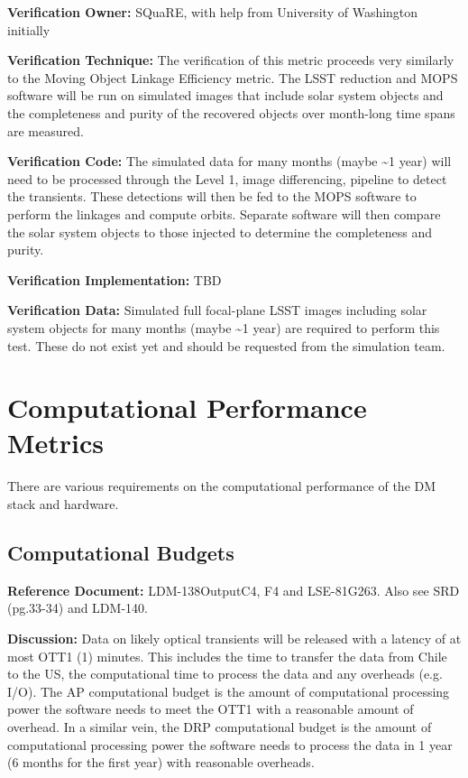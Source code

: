 \textbf{Verification Owner:} SQuaRE, with help from University of
Washington initially

\textbf{Verification Technique:} The verification of this metric
proceeds very similarly to the Moving Object Linkage Efficiency metric.
The LSST reduction and MOPS software will be run on simulated images
that include solar system objects and the completeness and purity of the
recovered objects over month-long time spans are measured.

\textbf{Verification Code:} The simulated data for many months (maybe
\textasciitilde{}1 year) will need to be processed through the Level 1,
image differencing, pipeline to detect the transients. These detections
will then be fed to the MOPS software to perform the linkages and
compute orbits. Separate software will then compare the solar system
objects to those injected to determine the completeness and purity.

\textbf{Verification Implementation:} TBD

\textbf{Verification Data:} Simulated full focal-plane LSST images
including solar system objects for many months (maybe \textasciitilde{}1
year) are required to perform this test. These do not exist yet and
should be requested from the simulation team.

\section{Computational Performance
Metrics}\label{computational-performance-metrics}

There are various requirements on the computational performance of the
DM stack and hardware.

\subsection{Computational Budgets}\label{computational-budgets}

\textbf{Reference Document:} LDM-138\textbar{}Output\textbar{}C4, F4 and
LSE-81\textbar{}G263. Also see SRD (pg.33-34) and LDM-140.

\textbf{Discussion:} Data on likely optical transients will be released
with a latency of at most OTT1 (1) minutes. This includes the time to
transfer the data from Chile to the US, the computational time to
process the data and any overheads (e.g. I/O). The AP computational
budget is the amount of computational processing power the software
needs to meet the OTT1 with a reasonable amount of overhead. In a
similar vein, the DRP computational budget is the amount of
computational processing power the software needs to process the data in
1 year (6 months for the first year) with reasonable overheads.

